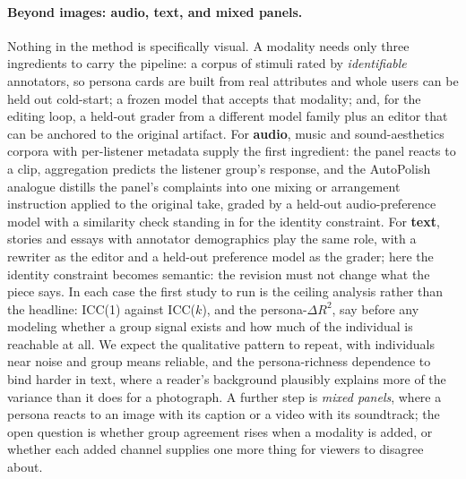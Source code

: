 \documentclass{article}
\begin{document}
\paragraph{Beyond images: audio, text, and mixed panels.} Nothing in the method is specifically visual. A modality needs only three ingredients to carry the pipeline: a corpus of stimuli rated by \emph{identifiable} annotators, so persona cards are built from real attributes and whole users can be held out cold-start; a frozen model that accepts that modality; and, for the editing loop, a held-out grader from a different model family plus an editor that can be anchored to the original artifact. For \textbf{audio}, music and sound-aesthetics corpora with per-listener metadata supply the first ingredient: the panel reacts to a clip, aggregation predicts the listener group's response, and the AutoPolish analogue distills the panel's complaints into one mixing or arrangement instruction applied to the original take, graded by a held-out audio-preference model with a similarity check standing in for the identity constraint. For \textbf{text}, stories and essays with annotator demographics play the same role, with a rewriter as the editor and a held-out preference model as the grader; here the identity constraint becomes semantic: the revision must not change what the piece says. In each case the first study to run is the ceiling analysis rather than the headline: ICC(1) against ICC($k$), and the persona-$\Delta R^2$, say before any modeling whether a group signal exists and how much of the individual is reachable at all. We expect the qualitative pattern to repeat, with individuals near noise and group means reliable, and the persona-richness dependence to bind harder in text, where a reader's background plausibly explains more of the variance than it does for a photograph. A further step is \emph{mixed panels}, where a persona reacts to an image with its caption or a video with its soundtrack; the open question is whether group agreement rises when a modality is added, or whether each added channel supplies one more thing for viewers to disagree about.
\end{document}
